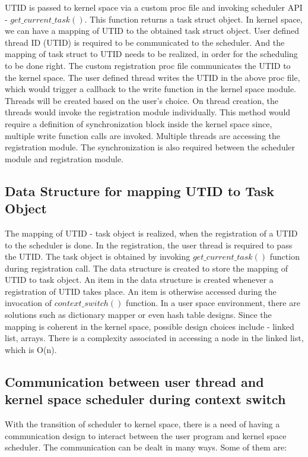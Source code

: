 UTID  is passed to kernel space via a custom proc file and invoking scheduler API - $get\_current\_task()$. 
This function returns a task struct object. 
In kernel space, we can have a mapping of UTID to the obtained task struct object. 
User defined thread ID (UTID) is required to be communicated to the scheduler. 
And the mapping of task struct to UTID needs to be realized, in order for the scheduling to be done right. 
The custom registration proc file communicates the UTID to the kernel space. 
The user defined thread writes the UTID in the above proc file, which would trigger a callback to the write function in the kernel space module. 
Threads will be created based on the user's choice. 
On thread creation, the threads would invoke the registration module individually. 
This method would require a definition of synchronization block inside the kernel space since, multiple write function calls are invoked. 
Multiple threads are accessing the registration module. 
The synchronization is also required between the scheduler module and registration module.


\subsection{Data Structure for mapping UTID to Task Object}

The mapping of UTID - task object is realized, when the registration of a UTID to the scheduler is done. 
In the registration, the user thread is required to pass the UTID. 
The task object is obtained by invoking $get\_current\_task()$ function during registration call. 
The data structure is created to store the mapping of UTID to task object. 
An item in the data structure is created whenever a registration of UTID takes place. 
An item is otherwise accessed during the invocation of $context\_switch()$ function. 
In a user space environment, there are solutions such as dictionary mapper or even hash table designs. 
Since the mapping is coherent in the kernel space, possible design choices include - linked list, arrays. 
There is a complexity associated in accessing a node in the linked list, which is O(n).

\subsection{Communication between user thread and kernel space scheduler during context switch} 

With the transition of scheduler to kernel space, there is a need of having a communication design to interact between the user program and kernel space scheduler. 
The communication can be dealt in many ways\cite{commkernelanduser}. 
Some of them are:

